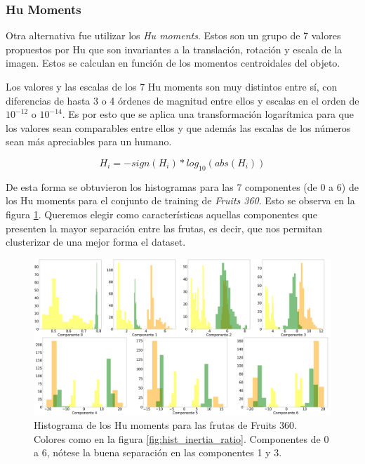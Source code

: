 \documentclass[10pt, a4paper]{article}
\begin{document}
\subsubsection{Hu Moments}

Otra alternativa fue utilizar los \textit{Hu moments}. Estos son un grupo de 7 valores propuestos por Hu \cite{Hu1962} \cite{Huang} que son invariantes a la translación, rotación y escala de la imagen. Estos se calculan en función de los momentos centroidales del objeto. 

Los valores y las escalas de los 7 Hu moments son muy distintos entre sí, con diferencias de hasta 3 o 4 órdenes de magnitud entre ellos y escalas en el orden de $10^{-12}$ o $10^{-14}$. Es por esto que se aplica una transformación logarítmica para que los valores sean comparables entre ellos y que además las escalas de los números sean más apreciables para un humano. 

\begin{equation*}
    H_i = -sign(H_i)*log_{10}(abs(H_i))
\end{equation*}

De esta forma se obtuvieron los histogramas para las 7 componentes (de 0 a 6) de los Hu moments para el conjunto de training de \textit{Fruits 360}. Esto se observa en la figura \ref{fig:hist_hu}. Queremos elegir como características aquellas componentes que presenten la mayor separación entre las frutas, es decir, que nos permitan clusterizar de una mejor forma el dataset.

\begin{figure}[h]
    \centering
    \includegraphics[width=\textwidth]{histogram_hu.png}
    \caption{Histograma de los Hu moments para las frutas de Fruits 360. Colores como en la figura \ref{fig:hist_inertia_ratio}. Componentes de 0 a 6, nótese la buena separación en las componentes 1 y 3.}
    \label{fig:hist_hu}
\end{figure}
\end{document}
